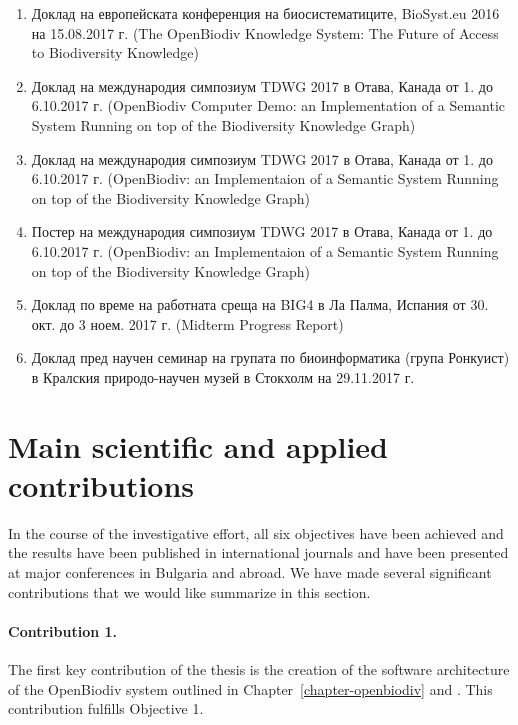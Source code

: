 \begin{enumerate}
    \item Доклад на европейската конференция на биосистематиците, BioSyst.eu 2016 на 15.08.2017 г. (The OpenBiodiv Knowledge System: The Future of Access to Biodiversity Knowledge)
    \item Доклад на международия симпозиум TDWG 2017 в Отава, Канада от 1. до 6.10.2017 г. (OpenBiodiv Computer Demo: an Implementation of a Semantic System Running on top of the Biodiversity Knowledge Graph)
    \item Доклад на международия симпозиум TDWG 2017 в Отава, Канада от 1. до 6.10.2017 г. (OpenBiodiv: an Implementaion of a Semantic System Running on top of the Biodiversity Knowledge Graph)
    \item Постер на международия симпозиум TDWG 2017 в Отава, Канада от 1. до 6.10.2017 г. (OpenBiodiv: an Implementaion of a Semantic System Running on top of the Biodiversity Knowledge Graph)
    \item Доклад по време на работната среща на BIG4 в Ла Палма, Испания от 30. окт. до 3 ноем. 2017 г. (Midterm Progress Report)
    \item Доклад пред научен семинар на групата по биоинформатика (група Ронкуист) в Кралския природо-научен музей в Стокхолм на 29.11.2017 г.
\end{enumerate}

\section*{Main scientific and applied contributions}


In the course of the investigative effort, all six objectives have been achieved and the results have been published in international journals and have been presented at major conferences in Bulgaria and abroad. We have made several significant contributions that we would like summarize in this section. 

\paragraph{Contribution 1.} The first key contribution of the thesis is the creation of the software architecture of the OpenBiodiv system outlined in Chapter~\ref{chapter-openbiodiv} and \cite{senderov_open_2016}. This contribution fulfills Objective 1.

